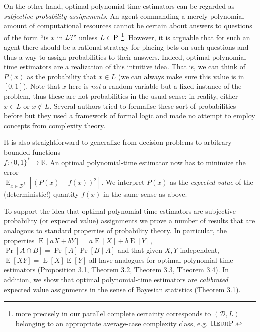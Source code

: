 \documentclass{article}
\numberwithin{equation}{section}
\theoremstyle{definition}
\theoremstyle{plain}
\newcommand{\Bool}{\{0,1\}}
\newcommand{\Words}{{\Bool^*}}
\DeclareMathOperator{\Prb}{Pr}
\DeclareMathOperator{\E}{E}
\newcommand{\Reals}{\mathbb{R}}
\newcommand{\Dist}{\mathcal{D}}
\begin{document}
On the other hand, optimal polynomial-time estimators can be regarded as \emph{subjective probability assignments}. An agent commanding a merely polynomial amount of computational resources cannot be certain about answers to questions of the form \enquote{is ${x}$ in ${L}?$} unless ${L \in\textsc{P}}$ \footnote{more precisely in our parallel complete certainty corresponds to ${(\Dist,L)}$ belonging to an appropriate average-case complexity class, e.g. ${\textsc{HeurP}}$.}. However, it is arguable that for such an agent there should be a rational strategy for placing bets on such questions and thus a way to assign probabilities to their answers. Indeed, optimal polynomial-time estimators are a realization of this intuitive idea. That is, we can think of ${P(x)}$ as the probability that ${x \in L}$ (we can always make sure this value is in ${[0,1]}$). Note that ${x}$ here is \emph{not} a random variable but a fixed instance of the problem, thus these are not probabilities in the usual sense: in reality, either ${x \in L}$ or ${x \not\in L}$. Several authors tried to formalise these sort of probabilities before \cite{Gaifman_2004,Hutter_2013,Demski_2012,Christiano_2014,Garrabrant_2015} but they used a framework of formal logic and made no attempt to employ concepts from complexity theory.

It is also straightforward to generalize from decision problems to arbitrary bounded functions\\ ${f: \Words \rightarrow \Reals}$. An optimal polynomial-time estimator now has to minimize the error\\ ${\E_{x \in \Dist^k}[(P(x)-f(x))^2]}$. We interpret ${P(x)}$ as the \emph{expected value} of the (deterministic!) quantity ${f(x)}$ in the same sense as above. 

To support the idea that optimal polynomial-time estimators are subjective probability (or expected value) assignments we prove a number of results that are analogous to standard properties of probability theory. In particular, the properties ${\E[a X+b Y]=a \E[X] + b\E[Y]}$, ${\Pr[A \cap B] = \Prb[A] \Prb[B \mid A]}$ and that given ${X,Y}$ independent, ${\E[XY] = \E[X]\E[Y]}$ all have analogues for optimal polynomial-time estimators (Proposition 3.1, Theorem 3.2, Theorem 3.3, Theorem 3.4). In addition, we show that optimal polynomial-time estimators are \emph{calibrated} expected value assignments in the sense of Bayesian statistics (Theorem 3.1).
\end{document}
